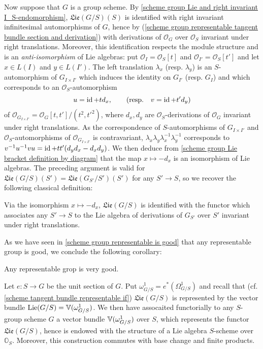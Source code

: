 Now suppose that $G$ is a group scheme. By \cref{scheme group Lie and right invariant I_S-endomorphism}, $\mathfrak{Lie}(G/S)(S)$ is identified with right invariant infinitesimal automorphisms of $G$, hence by (\ref{scheme group representable tangent bundle section and derivation}) with derivations of $\mathscr{O}_G$ over $\mathscr{O}_S$ invariant under right translations. Moreover, this identification respects the module structure and is an \textit{anti-isomorphism} of Lie algebras: put $\mathscr{O}_I=\mathscr{O}_S[t]$ and $\mathscr{O}_{I'}=\mathscr{O}_S[t']$ and let $x\in L(I)$ and $y\in L(I')$. The left translation $\lambda_x$ (resp. $\lambda_y$) is an $S$-automorphism of $G_{I\times I'}$ which induces the identity on $G_{I'}$ (resp. $G_I$) and which corresponds to an $\mathscr{O}_S$-automorphism
\[u=\operatorname{id}+td_x,\quad\quad (\text{resp.}\quad v=\operatorname{id}+t'd_y)\]
of $\mathscr{O}_{G_{I\times I'}}=\mathscr{O}_G[t,t']/(t^2,t'^2)$, where $d_x,d_y$ are $\mathscr{O}_S$-derivations of $\mathscr{O}_G$ invariant under right translations. As the correspondence of $S$-automorphisms of $G_{I\times I'}$ and $\mathscr{O}_S$-automorphisms of $\mathscr{O}_{G_{I\times I'}}$ is contravariant, $\lambda_x\lambda_y\lambda_x^{-1}\lambda_y^{-1}$ corresponds to $v^{-1}u^{-1}vu=\operatorname{id}+tt'(d_yd_x-d_xd_y)$. We then deduce from \cref{scheme group Lie bracket definition by diagram} that the map $x\mapsto-d_x$ is an isomorphism of Lie algebras. The preceding argument is valid for $\mathfrak{Lie}(G/S)(S')=\mathfrak{Lie}(G_{S'}/S')(S')$ for any $S'\to S$, so we recover the following classical definition:

\begin{proposition}\label{scheme group scheme Lie algebra isomorphic to derivation}
Via the isomorphism $x\mapsto -d_x$, $\mathfrak{Lie}(G/S)$ is identified with the functor which associates any $S'\to S$ to the Lie algebra of derivations of $G_{S'}$ over $S'$ invariant under right translations.
\end{proposition}

As we have seen in \cref{scheme group representable is good} that any representable group is good, we conclude the following corollary:

\begin{corollary}\label{scheme group representable is very good}
Any representable grop is very good.
\end{corollary}

Let $e:S\to G$ be the unit section of $G$. Put $\omega_{G/S}^1=e^*(\Omega_{G/S}^1)$ and recall that (cf. \cref{scheme tangent bundle representable if}) $\mathfrak{Lie}(G/S)$ is represented by the vector bundle $\mathrm{Lie}(G/S)=\mathbb{V}(\omega_{G/S}^1)$. We then have assocaited functorially to any $S$-group scheme $G$ a vector bundle $\mathbb{V}(\omega_{G/S}^1)$ over $S$, which represents the functor $\mathfrak{Lie}(G/S)$, hence is endowed with the structure of a Lie algebra $S$-scheme over $\mathbb{O}_S$. Moreover, this construction commutes with base change and finite products.


